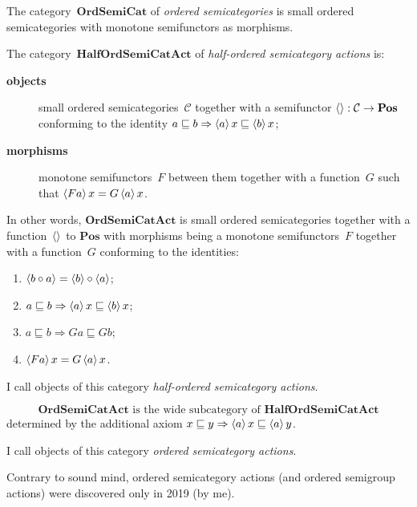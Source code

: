 \documentclass[a4paper,oneside,english,reqno]{amsart}
\begin{document}
\begin{defn}
The category~$\mathbf{OrdSemiCat}$ of \emph{ordered semicategories} is small ordered semicategories with monotone semifunctors as morphisms.
\end{defn}

\begin{defn}
The category~$\mathbf{HalfOrdSemiCatAct}$ of \emph{half-ordered semicategory actions} is:
\begin{description}
\item[\textbf{objects}] small ordered semicategories~$\mathcal{C}$ together with a semifunctor $\left\langle \right\rangle:\mathcal{C}\to\mathbf{Pos}$ conforming to the identity $a\sqsubseteq b\Rightarrow\left\langle a\right\rangle x\sqsubseteq\left\langle b\right\rangle x$;
\item[\textbf{morphisms}] monotone semifunctors~$F$ between them together with a function~$G$ such that $\left\langle Fa\right\rangle x=G\left\langle a\right\rangle x$.
\end{description}

In other words, $\mathbf{OrdSemiCatAct}$ is small ordered semicategories together with a function~$\left\langle \right\rangle$ to $\mathbf{Pos}$ with morphisms being a monotone semifunctors~$F$ together with a function~$G$ conforming to the identities:
\begin{enumerate}
\item $\left\langle b\circ a\right\rangle=\left\langle b\right\rangle\circ\left\langle a\right\rangle$;
\item $a\sqsubseteq b\Rightarrow\left\langle a\right\rangle x\sqsubseteq \left\langle b\right\rangle x$;
\item $a\sqsubseteq b\Rightarrow Ga\sqsubseteq Gb$;
\item $\left\langle Fa\right\rangle x=G\left\langle a\right\rangle x$.
\end{enumerate}

I call objects of this category \emph{half-ordered semicategory actions}.
\end{defn}

\begin{defn}
\[ \mathbf{OrdSemiCatAct}\text{ is the wide subcategory of }\mathbf{HalfOrdSemiCatAct} \]
determined by the additional axiom $x\sqsubseteq y\Rightarrow\left\langle a\right\rangle x\sqsubseteq\left\langle a\right\rangle y$.

I call objects of this category \emph{ordered semicategory actions}.
\end{defn}

\begin{rem}
Contrary to sound mind, ordered semicategory actions (and ordered semigroup actions) were discovered only in 2019 (by me).
\end{rem}
\end{document}

